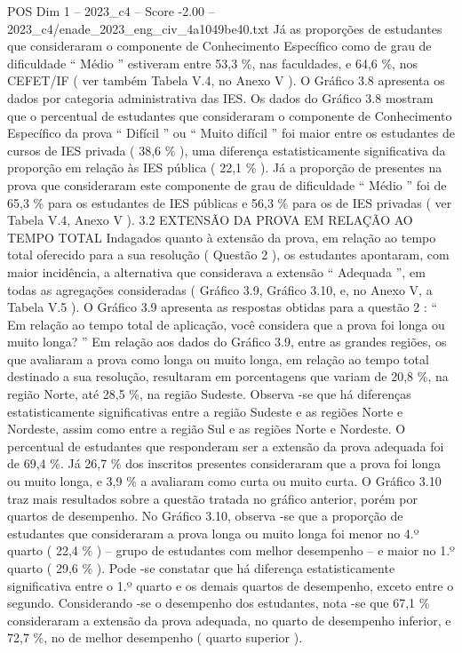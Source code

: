 \begin{textsample}{POS Dim 1 – 2023\_c4 – Score -2.00 – 2023\_c4/enade\_2023\_eng\_civ\_4a1049be40.txt}
Já as proporções de estudantes que consideraram o componente de Conhecimento Específico como de grau de dificuldade “ Médio ” estiveram entre 53,3 \%, nas faculdades, e 64,6 \%, nos CEFET/IF ( ver também Tabela V.4, no Anexo V ).
O Gráfico 3.8 apresenta os dados por categoria administrativa das IES.
Os dados do Gráfico 3.8 mostram que o percentual de estudantes que consideraram o componente de Conhecimento Específico da prova “ Difícil ” ou “ Muito difícil ” foi maior entre os estudantes de cursos de IES privada ( 38,6 \% ), uma diferença estatisticamente significativa da proporção em relação às IES pública ( 22,1 \% ).
Já a proporção de presentes na prova que consideraram este componente de grau de dificuldade “ Médio ” foi de 65,3 \% para os estudantes de IES públicas e 56,3 \% para os de IES privadas ( ver Tabela V.4, Anexo V ). 3.2 EXTENSÃO DA PROVA EM RELAÇÃO AO TEMPO TOTAL Indagados quanto à extensão da prova, em relação ao tempo total oferecido para a sua resolução ( Questão 2 ), os estudantes apontaram, com maior incidência, a alternativa que considerava a extensão “ Adequada ”, em todas as agregações consideradas ( Gráfico 3.9, Gráfico 3.10, e, no Anexo V, a Tabela V.5 ).
O Gráfico 3.9 apresenta as respostas obtidas para a questão 2 : “ Em relação ao tempo total de aplicação, você considera que a prova foi longa ou muito longa? ” Em relação aos dados do Gráfico 3.9, entre as grandes regiões, os que avaliaram a prova como longa ou muito longa, em relação ao tempo total destinado a sua resolução, resultaram em porcentagens que variam de 20,8 \%, na região Norte, até 28,5 \%, na região Sudeste.
Observa -se que há diferenças estatisticamente significativas entre a região Sudeste e as regiões Norte e Nordeste, assim como entre a região Sul e as regiões Norte e Nordeste.
O percentual de estudantes que responderam ser a extensão da prova adequada foi de 69,4 \%.
Já 26,7 \% dos inscritos presentes consideraram que a prova foi longa ou muito longa, e 3,9 \% a avaliaram como curta ou muito curta.
O Gráfico 3.10 traz mais resultados sobre a questão tratada no gráfico anterior, porém por quartos de desempenho.
No Gráfico 3.10, observa -se que a proporção de estudantes que consideraram a prova longa ou muito longa foi menor no 4.º quarto ( 22,4 \% ) – grupo de estudantes com melhor desempenho – e maior no 1.º quarto ( 29,6 \% ).
Pode -se constatar que há diferença estatisticamente significativa entre o 1.º quarto e os demais quartos de desempenho, exceto entre o segundo.
Considerando -se o desempenho dos estudantes, nota -se que 67,1 \% consideraram a extensão da prova adequada, no quarto de desempenho inferior, e 72,7 \%, no de melhor desempenho ( quarto superior ).

\end{textsample}
